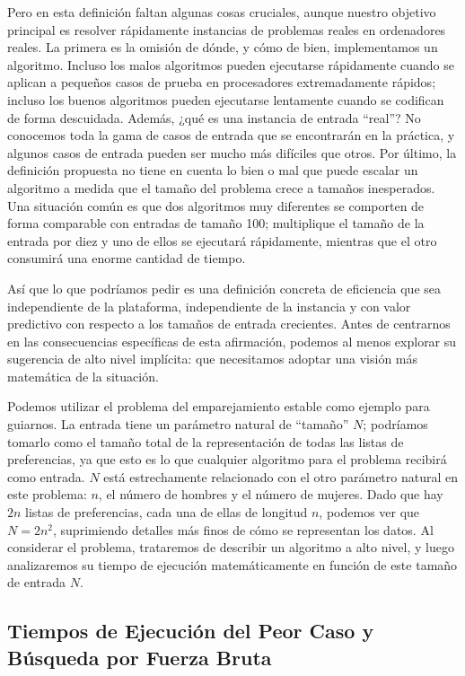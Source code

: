 \documentclass[a4paper, 12pt]{book}
\theoremstyle{dotless}
\begin{document}
Pero en esta definición faltan algunas cosas cruciales, aunque nuestro objetivo principal es resolver rápidamente instancias de problemas reales en ordenadores reales. La primera es la omisión de dónde, y cómo de bien, implementamos un algoritmo. Incluso los malos algoritmos pueden ejecutarse rápidamente cuando se aplican a pequeños casos de prueba en procesadores extremadamente rápidos; incluso los buenos algoritmos pueden ejecutarse lentamente cuando se codifican de forma descuidada.
Además, ¿qué es una instancia de entrada ``real''?
No conocemos toda la gama de casos de entrada que se encontrarán en la práctica, y algunos casos de entrada pueden ser mucho más difíciles que otros. 
Por último, la definición propuesta no tiene en cuenta lo bien o mal que puede escalar un algoritmo a medida que el tamaño del problema crece
a tamaños inesperados. Una situación común es que dos algoritmos muy diferentes se comporten de forma comparable con entradas de tamaño 100; multiplique el tamaño de la entrada por diez y uno de ellos se ejecutará rápidamente, mientras que el otro consumirá una enorme cantidad de tiempo.

Así que lo que podríamos pedir es una definición concreta de eficiencia que sea independiente de la plataforma, independiente de la instancia y con valor predictivo con respecto a los tamaños de entrada crecientes. Antes de centrarnos en las consecuencias específicas de esta afirmación, podemos al menos explorar su sugerencia de alto nivel implícita: que necesitamos adoptar una visión más matemática de la situación.

Podemos utilizar el problema del emparejamiento estable como ejemplo para guiarnos. La entrada tiene un parámetro natural de ``tamaño'' $N$; podríamos tomarlo como el tamaño total de la representación de todas las listas de preferencias, ya que esto es lo que cualquier algoritmo para el problema recibirá como entrada. $N$ está estrechamente relacionado con el otro parámetro natural en este problema: $n$, el número de hombres y el número de mujeres. Dado que hay $2n$ listas de preferencias, cada una de ellas de longitud $n$, podemos ver que $N = 2n^2$, suprimiendo detalles más finos de cómo se representan los datos. Al considerar el problema, trataremos de describir un algoritmo a alto nivel, y luego analizaremos su tiempo de ejecución matemáticamente en función de este tamaño de entrada $N$.


\subsection*{Tiempos de Ejecución del Peor Caso y Búsqueda por Fuerza Bruta} 
\end{document}
